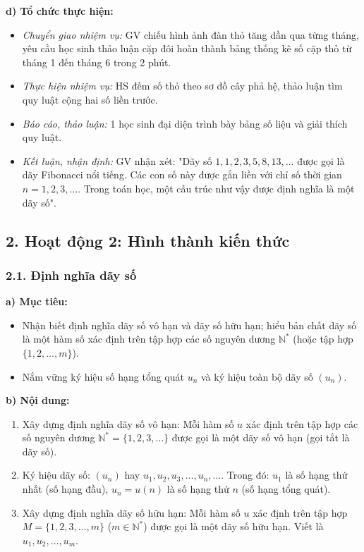 \documentclass[12pt, a4paper]{article}
\begin{document}
\noindent \textbf{d) Tổ chức thực hiện:}  
\begin{itemize}[leftmargin=0.8cm]  
    \item \textit{Chuyển giao nhiệm vụ:} GV chiếu hình ảnh đàn thỏ tăng dần qua từng tháng, yêu cầu học sinh thảo luận cặp đôi hoàn thành bảng thống kê số cặp thỏ từ tháng 1 đến tháng 6 trong 2 phút.  
    \item \textit{Thực hiện nhiệm vụ:} HS đếm số thỏ theo sơ đồ cây phả hệ, thảo luận tìm quy luật cộng hai số liền trước.  
    \item \textit{Báo cáo, thảo luận:} 1 học sinh đại diện trình bày bảng số liệu và giải thích quy luật.  
    \item \textit{Kết luận, nhận định:} GV nhận xét: "Dãy số $1, 1, 2, 3, 5, 8, 13,\dots$ được gọi là dãy Fibonacci nổi tiếng. Các con số này được gắn liền với chỉ số thời gian $n = 1, 2, 3,\dots$. Trong toán học, một cấu trúc như vậy được định nghĩa là một dãy số".  
\end{itemize}  
  
\subsection*{2. Hoạt động 2: Hình thành kiến thức}  
  
\subsubsection*{2.1. Định nghĩa dãy số}  
  
\noindent \textbf{a) Mục tiêu:}  
\begin{itemize}[leftmargin=0.8cm]  
    \item Nhận biết định nghĩa dãy số vô hạn và dãy số hữu hạn; hiểu bản chất dãy số là một hàm số xác định trên tập hợp các số nguyên dương $\mathbb{N}^*$ (hoặc tập hợp $\{1, 2, \dots, m\}$).  
    \item Nắm vững ký hiệu số hạng tổng quát $u_n$ và ký hiệu toàn bộ dãy số $(u_n)$.  
\end{itemize}  
  
\noindent \textbf{b) Nội dung:}  
\begin{enumerate}[leftmargin=0.6cm]  
    \item Xây dựng định nghĩa dãy số vô hạn: Mỗi hàm số $u$ xác định trên tập hợp các số nguyên dương $\mathbb{N}^* = \{1, 2, 3, \dots\}$ được gọi là một dãy số vô hạn (gọi tắt là dãy số).  
    \item Ký hiệu dãy số: $(u_n)$ hay $u_1, u_2, u_3, \dots, u_n, \dots$.  
    Trong đó: $u_1$ là số hạng thứ nhất (số hạng đầu), $u_n = u(n)$ là số hạng thứ $n$ (số hạng tổng quát).  
    \item Xây dựng định nghĩa dãy số hữu hạn: Mỗi hàm số $u$ xác định trên tập hợp $M = \{1, 2, 3, \dots, m\}$ ($m \in \mathbb{N}^*$) được gọi là một dãy số hữu hạn. Viết là $u_1, u_2, \dots, u_m$.  
\end{enumerate}  
  
\end{document}
